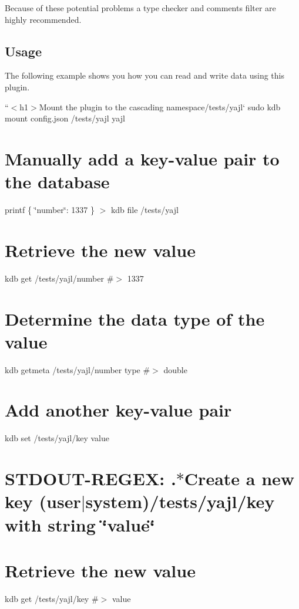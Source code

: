 Because of these potential problems a type checker and comments filter are highly recommended.

\subsection*{Usage}

The following example shows you how you can read and write data using this plugin.

``{\ttfamily  $<$h1$>$Mount the plugin to the cascading namespace}/tests/yajl` sudo kdb mount config.\+json /tests/yajl yajl

\section*{Manually add a key-\/value pair to the database}

printf \textquotesingle{}\{ \char`\"{}number\char`\"{}\+: 1337 \}\textquotesingle{} $>$ {\ttfamily kdb file /tests/yajl}

\section*{Retrieve the new value}

kdb get /tests/yajl/number \#$>$ 1337

\section*{Determine the data type of the value}

kdb getmeta /tests/yajl/number type \#$>$ double

\section*{Add another key-\/value pair}

kdb set /tests/yajl/key value \section*{S\+T\+D\+O\+U\+T-\/\+R\+E\+G\+EX\+: .$\ast$\+Create a new key (user$\vert$system)/tests/yajl/key with string \char`\"{}value\char`\"{}}

\section*{Retrieve the new value}

kdb get /tests/yajl/key \#$>$ value

